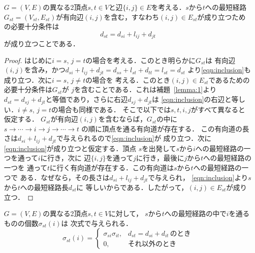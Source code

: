 \begin{lemma}
  $G=(V,E)$の異なる2頂点$s,t\in V$と辺$\{i,j\} \in E$を考える．$s$から$t$への最短経路$G_{st}=(V_{st},E_{st})$が有向辺$(i,j)$を含む，すなわち$(i,j) \in E_{st}$が成り立つための必要十分条件は
  \begin{equation}
    d_{st}=d_{si}+l_{ij}+d_{jt}
    \label{eqn:inclusion}
  \end{equation}
  が成り立つことである．
  \label{lemma:2}
\end{lemma}
\begin{proof}
  はじめに$i=s$, $j=t$の場合を考える．このとき明らかに$G_{st}$は
  有向辺$(i,j)$を含み，かつ$d_{si}+l_{ij}+d_{jt}=d_{ss}+l_{st}+d_{tt}=l_{st}=d_{st}$
  より\eqref{eqn:inclusion}も成り立つ．次に$i=s$, $j \neq t$の場合を
  考える．このとき$(i,j)\in E_{st}$であるための必要十分条件は$G_{st}$が
  $j$を含むことである．これは補題~\ref{lemma:1}より
  $d_{st}=d_{sj}+d_{jt}$と等価であり，さらに右辺$d_{sj}+d_{jt}$は
  \eqref{eqn:inclusion}の右辺と等しい．$i\neq s$, $j=t$の場合も同様である．
  そこで以下では$s,t,i,j$がすべて異なると仮定する．
  $G_{st}$が有向辺$(i,j)$を含むならば，$G_{st}$の中に
  $s \rightarrow \cdots \rightarrow i \rightarrow j \rightarrow \cdots \rightarrow t$
  の順に頂点を通る有向道が存在する．
  この有向道の長さは$d_{si}+l_{ij}+d_{jt}$で与えられるので\eqref{eqn:inclusion}が
  成り立つ．次に\eqref{eqn:inclusion}が成り立つと仮定する．頂点
  $s$を出発して$s$から$i$への最短経路の一つを通って$i$に行き，次に
  辺$\{i,j\}$を通って$j$に行き，最後に$j$から$t$への最短経路の一つを
  通って$t$に行く有向道が存在する．この有向道は$s$から$t$への最短経路の一つで
  ある．なぜなら，その長さは$d_{si}+l_{ij}+d_{jt}$で与えられ，
  \eqref{eqn:inclusion}より$s$から$t$への最短経路長$d_{st}$に
  等しいからである．したがって，$(i,j) \in E_{st}$が成り立つ．
\end{proof}

\begin{lemma}
  $G=(V,E)$の異なる2頂点$s,t \in V$に対して，
  $s$から$t$への最短経路の中で$i$を通るものの個数$\sigma_{st}(i)$は
  次式で与えられる．
  \begin{equation}
    \sigma_{st}(i)=
    \left\{
    \begin{array}{ll}
      \sigma_{si} \sigma_{it}, & d_{st}=d_{si}+d_{it}\,\mbox{のとき} \\
      0, & \mbox{それ以外のとき}
    \end{array}
    \right.
    \label{eqn:sigma_sti}
  \end{equation}
  \label{lemma:3}
\end{lemma}

